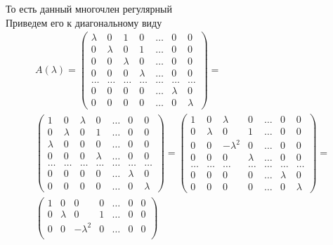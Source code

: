 		То есть данный многочлен регулярный\\
		Приведем его к диагональному виду
		\begin{gather*}
			A(\lambda) = 
			\begin{pmatrix}
				\lambda & 0 & 1 & 0 & \ldots & 0 & 0 \\
				0 & \lambda & 0 & 1 & \ldots & 0 & 0 \\
				0 & 0 & \lambda & 0 & \ldots & 0 & 0 \\
				0 & 0 & 0 & \lambda & \ldots & 0 & 0 \\
				\ldots & \ldots & \ldots & \ldots & \ldots & \ldots & \ldots\\
				0 & 0 & 0 & 0 & \ldots & \lambda & 0 \\
				0 & 0 & 0 & 0 & \ldots & 0 & \lambda
			\end{pmatrix}
			=\\
			\begin{pmatrix}
				1 & 0 & \lambda & 0 & \ldots & 0 & 0 \\
				0 & \lambda & 0 & 1 & \ldots & 0 & 0 \\
				\lambda & 0 & 0 & 0 & \ldots & 0 & 0 \\
				0 & 0 & 0 & \lambda & \ldots & 0 & 0 \\
				\ldots & \ldots & \ldots & \ldots & \ldots & \ldots & \ldots\\
				0 & 0 & 0 & 0 & \ldots & \lambda & 0 \\
				0 & 0 & 0 & 0 & \ldots & 0 & \lambda
			\end{pmatrix}
			=
			\begin{pmatrix}
				1 & 0 & \lambda & 0 & \ldots & 0 & 0 \\
				0 & \lambda & 0 & 1 & \ldots & 0 & 0 \\
				0 & 0 & -\lambda^2 & 0 & \ldots & 0 & 0 \\
				0 & 0 & 0 & \lambda & \ldots & 0 & 0 \\
				\ldots & \ldots & \ldots & \ldots & \ldots & \ldots & \ldots\\
				0 & 0 & 0 & 0 & \ldots & \lambda & 0 \\
				0 & 0 & 0 & 0 & \ldots & 0 & \lambda
			\end{pmatrix}
			=\\
			\begin{pmatrix}
				1 & 0 & 0 & 0 & \ldots & 0 & 0 \\
				0 & \lambda & 0 & 1 & \ldots & 0 & 0 \\
				0 & 0 & -\lambda^2 & 0 & \ldots & 0 & 0 \\

\end{pmatrix}
\end{gather*}
